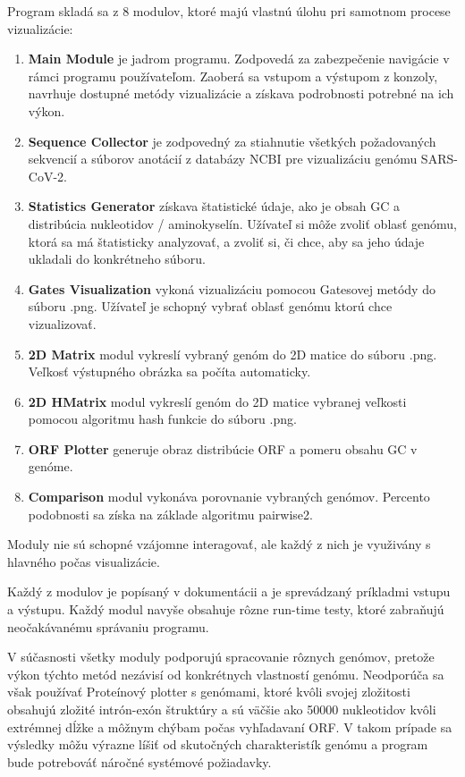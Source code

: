 Program skladá sa z 8 modulov, ktoré majú vlastnú úlohu pri samotnom procese vizualizácie:
\begin{enumerate}
    \item \textbf{Main Module} je jadrom programu. Zodpovedá za zabezpečenie navigácie v rámci programu používateľom.
    Zaoberá sa vstupom a výstupom z konzoly, navrhuje dostupné metódy vizualizácie a získava podrobnosti potrebné na ich výkon.
    \item \textbf{Sequence Collector} je zodpovedný za stiahnutie všetkých požadovaných sekvencií a súborov anotácií z databázy NCBI pre vizualizáciu genómu SARS-CoV-2.
    \item \textbf{Statistics Generator} získava štatistické údaje, ako je obsah GC a distribúcia nukleotidov / aminokyselín.
    Užívateľ si môže zvoliť oblasť genómu, ktorá sa má štatisticky analyzovať, a zvoliť si, či chce, aby sa jeho údaje ukladali do konkrétneho súboru.
    \item \textbf{Gates Visualization} vykoná vizualizáciu pomocou Gatesovej metódy do súboru .png.
    Užívateľ je schopný vybrať oblasť genómu ktorú chce vizualizovať.
    \item \textbf{2D Matrix} modul vykreslí vybraný genóm do 2D matice do súboru .png. Veľkosť výstupného obrázka sa počíta automaticky.
    \item \textbf{2D HMatrix} modul vykreslí genóm do 2D matice vybranej veľkosti pomocou algoritmu hash funkcie do súboru .png.
    \item \textbf{ORF Plotter} generuje obraz distribúcie ORF a pomeru obsahu GC v genóme.
    \item \textbf{Comparison} modul vykonáva porovnanie vybraných genómov. Percento podobnosti sa získa na základe algoritmu pairwise2.
\end{enumerate}

Moduly nie sú schopné vzájomne interagovať, ale každý z nich je využivány s hlavného počas visualizácie.

Každý z modulov je popísaný v dokumentácii a je sprevádzaný príkladmi vstupu a výstupu.
Každý modul navyše obsahuje rôzne run-time testy, ktoré zabraňujú neočakávanému správaniu programu.

V súčasnosti všetky moduly podporujú spracovanie rôznych genómov, pretože výkon týchto metód nezávisí od konkrétnych vlastností genómu.
Neodporúča sa však používať Proteínový plotter s genómami, ktoré kvôli svojej zložitosti obsahujú zložité intrón-exón štruktúry a sú väčšie ako 50000 nukleotidov kvôli extrémnej dĺžke a môžnym chýbam počas vyhľadavaní ORF.
V takom prípade sa výsledky môžu výrazne líšiť od skutočných charakteristík genómu a program bude potrebováť náročné systémové požiadavky.
